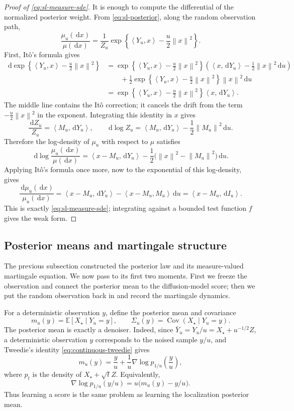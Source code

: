 \documentclass{amsart}
\numberwithin{equation}{section}
\theoremstyle{plain}
\theoremstyle{definition}
\theoremstyle{remark}
\DeclareMathOperator{\Cov}{Cov}
\newcommand{\E}{\mathbb{E}}
\newcommand{\dd}{\,\mathrm{d}}
\newcommand{\norm}[1]{\left\lVert #1 \right\rVert}
\newcommand{\ip}[2]{\left\langle #1,#2 \right\rangle}
\begin{document}
\begin{proof}[Proof of \eqref{eq:sl-measure-sde}]
It is enough to compute the differential of the normalized posterior weight.
From \eqref{eq:sl-posterior}, along the random observation path,
\[
    \frac{\mu_u(\dd x)}{\mu(\dd x)}
    =
    \frac{1}{Z_u}
    \exp\left\{\ip{Y_u}{x}-\frac{u}{2}\norm{x}^2\right\}.
\]
First, It\^o's formula gives
\[
    \begin{aligned}
    \dd
    \exp\left\{\ip{Y_u}{x}-\frac{u}{2}\norm{x}^2\right\}
    &=
    \exp\left\{\ip{Y_u}{x}-\frac{u}{2}\norm{x}^2\right\}
    \left(\ip{x}{\dd Y_u}-\frac12\norm{x}^2\dd u\right)
    \\
    &\qquad
    +
    \frac12
    \exp\left\{\ip{Y_u}{x}-\frac{u}{2}\norm{x}^2\right\}
    \norm{x}^2\dd u
    \\
    &=
    \exp\left\{\ip{Y_u}{x}-\frac{u}{2}\norm{x}^2\right\}
    \ip{x}{\dd Y_u}.
    \end{aligned}
\]
The middle line contains the It\^o correction; it cancels the drift from
the term $-\frac u2\norm{x}^2$ in the exponent.  Integrating this identity
in $x$ gives
\[
    \frac{\dd Z_u}{Z_u}=\ip{M_u}{\dd Y_u},
    \qquad
    \dd\log Z_u=\ip{M_u}{\dd Y_u}-\frac12\norm{M_u}^2\dd u.
\]
Therefore the log-density of $\mu_u$ with respect to $\mu$ satisfies
\[
    \dd\log\frac{\mu_u(\dd x)}{\mu(\dd x)}
    =
    \ip{x-M_u}{\dd Y_u}
    -
    \frac12\bigl(\norm{x}^2-\norm{M_u}^2\bigr)\dd u.
\]
Applying It\^o's formula once more, now to the exponential of this
log-density, gives
\[
    \frac{\dd\mu_u(\dd x)}{\mu_u(\dd x)}
    =
    \ip{x-M_u}{\dd Y_u}
    -
    \ip{x-M_u}{M_u}\dd u
    =
    \ip{x-M_u}{\dd I_u}.
\]
This is exactly \eqref{eq:sl-measure-sde}; integrating against a bounded test
function $f$ gives the weak form.
\end{proof}

\subsection{Posterior means and martingale structure}

The previous subsection constructed the posterior law and its measure-valued
martingale equation.  We now pass to its first two moments.  First we freeze
the observation and connect the posterior mean to the diffusion-model score;
then we put the random observation back in and record the martingale dynamics.

For a deterministic observation $y$, define the posterior mean and covariance
\[
    m_u(y)=\E[X_\star\mid Y_u=y],
    \qquad
    \Sigma_u(y)=\Cov(X_\star\mid Y_u=y).
\]
The posterior mean is exactly a denoiser.  Indeed, since
$\bar Y_u=Y_u/u=X_\star+u^{-1/2}Z$, a deterministic observation $y$
corresponds to the noised sample $y/u$, and Tweedie's identity
\eqref{eq:continuous-tweedie} gives
\begin{equation}\label{eq:sl-tweedie}
    m_u(y)
    =
    \frac{y}{u}
    +
    \frac{1}{u}
    \nabla\log p_{1/u}\!\left(\frac{y}{u}\right),
\end{equation}
where $p_t$ is the density of $X_\star+\sqrt{t}Z$.  Equivalently,
\[
    \nabla\log p_{1/u}(y/u)
    =
    u\bigl(m_u(y)-y/u\bigr).
\]
Thus learning a score is the same problem as learning the
localization posterior mean.
\end{document}

